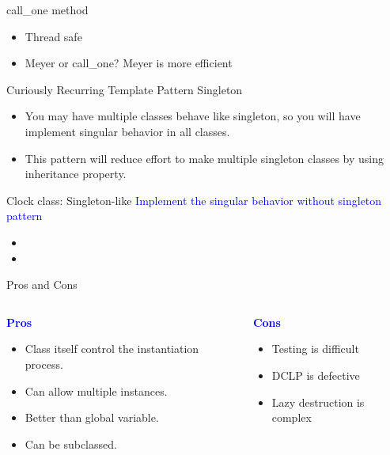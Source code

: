 \documentclass[13pt]{beamer}
\begin{document}
\begin{frame}{call\_one method}
\begin{itemize}
	\setlength\itemsep{1em}
	\item Thread safe
	\item Meyer or call\_one? Meyer is more efficient
\end{itemize}
\end{frame}

\begin{frame}{Curiously Recurring Template Pattern Singleton}
\begin{itemize}
	\setlength\itemsep{1em}
	\item You may have multiple classes behave like singleton, so you will have implement singular behavior in all classes.
	\item This pattern will reduce effort to make multiple singleton classes by using inheritance property.
\end{itemize}
\end{frame}

\begin{frame}{Clock class: Singleton-like}
\textcolor{blue}{Implement the singular behavior without singleton pattern}
\begin{itemize}
	\setlength\itemsep{1em}
	\item
	\item
\end{itemize}
\end{frame}

\begin{frame}{Pros and Cons}
\begin{columns}[T]
\begin{column}{.45\textwidth}
	\begin{center}
	\textcolor{blue}{\textbf{Pros}}
	\end{center}
	\begin{itemize}
		\setlength\itemsep{1em}
		\item Class itself control the instantiation process.
		\item Can allow multiple instances.
		\item Better than global variable.
		\item Can be subclassed.
	\end{itemize}
\end{column}
\begin{column}{.45\textwidth}
	\begin{center}
	\textcolor{blue}{\textbf{Cons}}
	\end{center}
		\begin{itemize}
		\setlength\itemsep{1em}
		\item Testing is difficult
		\item DCLP is defective
		\item Lazy destruction is complex
	\end{itemize}
\end{column}
\end{columns}
\end{frame}
\end{document}
